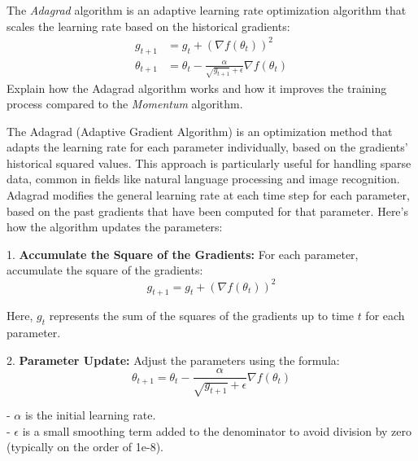 The \textit{Adagrad} algorithm is an adaptive learning rate optimization algorithm that scales the learning rate based on the historical gradients:
\[
\begin{aligned}
g_{t+1} &= g_t + (\nabla f(\theta_t))^2 \\
\theta_{t+1} &= \theta_t - \frac{\alpha}{\sqrt{g_{t+1}} + \epsilon} \nabla f(\theta_t)
\end{aligned}
\]
Explain how the Adagrad algorithm works and how it improves the training process compared to the \textit{Momentum} algorithm.
\begin{qsolve}
    \begin{qsolve}[]
        The Adagrad (Adaptive Gradient Algorithm) is an optimization method that adapts the learning rate for each parameter individually, based on the gradients' historical squared values. This approach is particularly useful for handling sparse data, common in fields like natural language processing and image recognition.
        \splitqsolve[\splitqsolve]
        Adagrad modifies the general learning rate at each time step for each parameter, based on the past gradients that have been computed for that parameter. Here’s how the algorithm updates the parameters:

        1. \textbf{Accumulate the Square of the Gradients:} For each parameter, accumulate the square of the gradients:
        \[
        g_{t+1} = g_t + (\nabla f(\theta_t))^2
        \]

        Here, \( g_t \) represents the sum of the squares of the gradients up to time \( t \) for each parameter.

        2. \textbf{Parameter Update:} Adjust the parameters using the formula:
        \[
        \theta_{t+1} = \theta_t - \frac{\alpha}{\sqrt{g_{t+1}} + \epsilon} \nabla f(\theta_t)
        \]

        - \(\alpha\) is the initial learning rate. \\
        - \(\epsilon\) is a small smoothing term added to the denominator to avoid division by zero (typically on the order of 1e-8).


\end{qsolve}
\end{qsolve}

